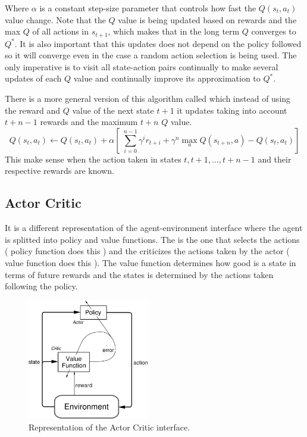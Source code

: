 Where $\alpha$ is a constant step-size parameter that controls how fast the $Q(s_t, a_t)$ value change. Note that the $Q$ value is being updated based on rewards and the max $Q$ of all actions in $s_{t+1}$, which makes that in the long term $Q$ converges to $Q^*$. It is also important that this updates does not depend on the policy followed so it will converge even in the case a random action selection is being used. The only imperative is to visit all state-action pairs continually to make several updates of each $Q$ value and continually improve its approximation to $Q^*$.

There is a more general version of this algorithm called  which instead of using the reward and $Q$ value of the next state $t+1$ it updates taking into account $t+n-1$ rewards and the maximum $t+n$ $Q$ value.
\begin{equation}
    Q(s_t,a_t)\leftarrow Q(s_t,a_t) + \alpha [\;\sum^{n-1}_{i=0}\gamma^i r_{t+i} + \gamma^n \max_a Q(s_{t+n},a) - Q(s_t,a_t)]
\end{equation}
This make sense when the action taken in states $t, t+1,\dots , t+n-1$ and their respective rewards are known.

\subsection{Actor Critic\label{subsec:AC}}
It is a different representation of the agent-environment interface where the agent is splitted into policy and value
functions.
The  is the one that selects the actions ( policy function does this ) and the
 criticizes the actions taken by the actor ( value function does this ). The value function
determines how good is a state in terms of future rewards and the states is determined by the actions taken following the policy.

\begin{figure}[hbtp]
\begin{center}
\includegraphics[width=200]{img/actor_critic.png}
\end{center}
\caption[Actor Critic diagram]
{Representation of the Actor Critic interface.}
\label{fig:AC}
\end{figure}

